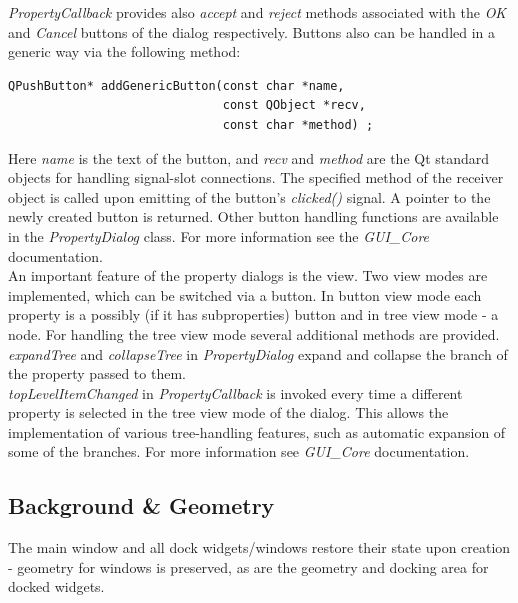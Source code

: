 \documentclass{article}
\begin{document}
\emph{PropertyCallback} provides also \emph{accept} and \emph{reject} methods associated with the \emph{OK} and \emph{Cancel} buttons of the dialog respectively. Buttons also can be handled in a generic way via the following method:
\begin{lstlisting}
QPushButton* addGenericButton(const char *name, 
                              const QObject *recv, 
                              const char *method) ;  

\end{lstlisting}

Here \emph{name} is the text of the button, and \emph{recv} and \emph{method} are the Qt standard objects for handling signal-slot connections. The specified method of the receiver object is called upon emitting of the button's \emph{clicked()} signal. A pointer to the newly created button is returned. Other button handling functions are available in the \emph{PropertyDialog} class. For more information see the \emph{GUI\_Core} documentation.\\

An important feature of the property dialogs is the view. Two view modes are implemented, which can be switched via a button. In button view mode each property is a possibly (if it has subproperties) button and in tree view mode - a node. For handling the tree view mode several additional methods are provided. \\

\emph{expandTree} and \emph{collapseTree} in \emph{PropertyDialog} expand and collapse the branch of the property passed to them.\\

\emph{topLevelItemChanged} in \emph{PropertyCallback} is invoked every time a different property is selected in the tree view mode of the dialog. This allows the implementation of various tree-handling features, such as automatic expansion of some of the branches. For more information see \emph{GUI\_Core} documentation.



\subsection{Background \& Geometry}

The main window and all dock widgets/windows restore their state upon creation - geometry for windows is preserved, as are the geometry and docking area for docked widgets.\\
\end{document}
